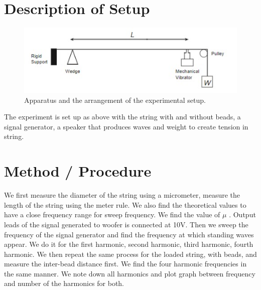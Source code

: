 \section{Description of Setup}
\newpage
\begin{figure}[h!]
   \centering
    \includegraphics[width=\textwidth]{figures/fig11.jpeg}
    \caption{Apparatus and the arrangement of the experimental setup.}
    \label{fig:yx}
\end{figure}
The experiment is set up as above with the string with and without beads, a signal generator, a speaker that produces waves and weight to create tension in string. 


\section{Method / Procedure}
We first measure the diameter of the string using a micrometer, measure the length of the string using the meter rule. We also find the theoretical values to have a close frequency range for sweep frequency. We find the value of $\mu$ . Output leads of the signal generated to woofer is connected at 10V. Then we sweep the frequency of the signal generator and find the frequency at which standing waves appear. We do it for the first harmonic, second harmonic, third harmonic, fourth harmonic. We then repeat the same process for the loaded string, with beads, and measure the inter-bead distance first. We find the four harmonic frequencies in the same manner. We note down all harmonics and plot graph between frequency and number of the harmonics for both. 

